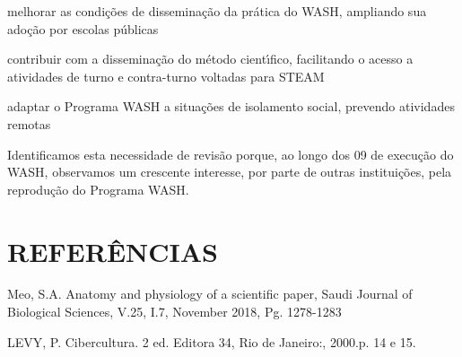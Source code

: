 \documentclass[
12pt,		%
openright,	%
twoside,  %
a4paper,			%
chapter=TITLE,		%
english,			%
french,				%
spanish,			%
brazil				%
]{USPSC-classe/USPSC}
\begin{document}
\begin{alineas}
\item melhorar as condi\c{c}\~oes de dissemina\c{c}\~ao da pr\'atica do WASH, ampliando sua ado\c{c}\~ao por escolas p\'ublicas
\item contribuir com a dissemina\c{c}\~ao do m\'etodo cient\'{\i}fico, facilitando o acesso a atividades de turno e contra-turno voltadas para STEAM
\item adaptar o Programa WASH a situa\c{c}\~oes de isolamento social, prevendo atividades remotas
\end{alineas}

Identificamos esta necessidade de revis\~ao porque, ao longo dos 09 de execu\c{c}\~ao do WASH, observamos um crescente interesse, por parte de outras institui\c{c}\~oes, pela reprodu\c{c}\~ao do Programa WASH.




\chapter[REFER\^ENCIAS]{REFER\^ENCIAS}\label{REFER\^ENCIAS}
\begin{flushleft}
\begin{flushleft}
\begin{flushleft}
\begin{flushleft}
[MEO, 2018] Meo, S.A. Anatomy and physiology of a scientific paper, Saudi Journal of Biological Sciences, V.25, I.7, November 2018, Pg. 1278-1283
\end{flushleft}


\end{flushleft}


\end{flushleft}


\end{flushleft}


\begin{flushleft}
\begin{flushleft}
\begin{flushleft}
\begin{flushleft}
[LEVY, 2000] LEVY, P. Cibercultura. 2 ed. Editora 34,  Rio de Janeiro:, 2000.p. 14 e 15.
\end{flushleft}


\end{flushleft}


\end{flushleft}


\end{flushleft}
\end{document}
